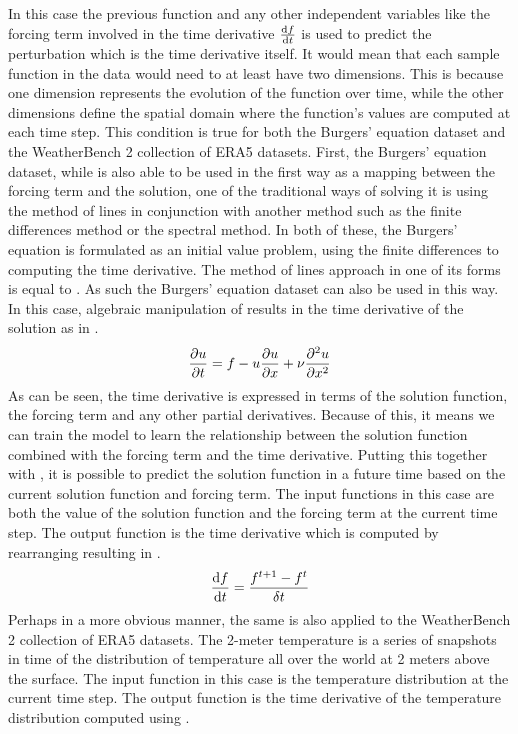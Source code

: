 In this case the previous function and any other independent variables like the forcing term involved in the time derivative \(\dv{f}{t}\) is used to predict the perturbation which is the time derivative itself. It would mean that each sample function in the data would need to at least have two dimensions. This is because one dimension represents the evolution of the function over time, while the other dimensions define the spatial domain where the function's values are computed at each time step. This condition is true for both the Burgers' equation dataset and the WeatherBench 2 collection of ERA5 datasets. First, the Burgers' equation dataset, while is also able to be used in the first way as a mapping between the forcing term and the solution, one of the traditional ways of solving it is using the method of lines in conjunction with another method such as the finite differences method or the spectral method. In both of these, the Burgers' equation is formulated as an initial value problem, using the finite differences to computing the time derivative. %
The method of lines approach in one of its forms is equal to  \autocite{schiesserNumericalMethodLines2012,sadikuSimpleIntroductionMethod2000}. As such the Burgers' equation dataset can also be used in this way. In this case, algebraic manipulation of  results in the time derivative of the solution as in .
\begin{align}
  \pdv{u}{t} = f - u\pdv{u}{x} + \nu\pdv[2]{u}{x} \label{eq:forced_viscous_burgers_time_derivative}
\end{align}
As can be seen, the time derivative is expressed in terms of the solution function, the forcing term and any other partial derivatives. Because of this, it means we can train the model to learn the relationship between the solution function combined with the forcing term and the time derivative. Putting this together with , it is possible to predict the solution function in a future time based on the current solution function and forcing term. The input functions in this case are both the value of the solution function and the forcing term at the current time step. The output function is the time derivative which is computed by rearranging  resulting in .
\begin{equation}
  \dv{f}{t} = \frac{f^{t+1} - f^{t}}{\delta t} \label{eq:time_derivative_time_step_function}
\end{equation}
Perhaps in a more obvious manner, the same is also applied to the WeatherBench 2 collection of ERA5 datasets. The 2-meter temperature is a series of snapshots in time of the distribution of temperature all over the world at 2 meters above the surface. The input function in this case is the temperature distribution at the current time step. The output function is the time derivative of the temperature distribution computed using .


